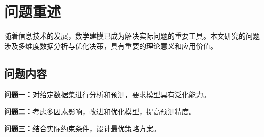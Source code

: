 \section{问题重述}

随着信息技术的发展，数学建模已成为解决实际问题的重要工具。本文研究的问题涉及多维度数据分析与优化决策，具有重要的理论意义和应用价值。

\subsection{问题内容}

\textbf{问题一：}对给定数据集进行分析和预测，要求模型具有泛化能力。

\textbf{问题二：}考虑多因素影响，改进和优化模型，提高预测精度。

\textbf{问题三：}结合实际约束条件，设计最优策略方案。
